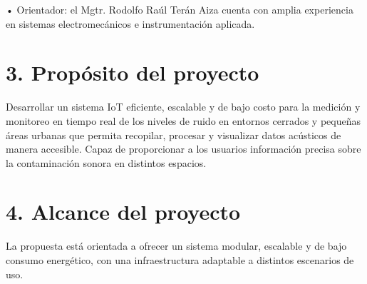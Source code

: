 \documentclass[
11pt, %
]{charter}
\begin{document}
• Orientador: el Mgtr. Rodolfo Raúl Terán Aiza cuenta con amplia experiencia en sistemas electromecánicos e instrumentación aplicada.


\section{3. Propósito del proyecto}
\label{sec:proposito}
 
Desarrollar un sistema IoT eficiente, escalable y de bajo costo para la medición y monitoreo en tiempo real de los niveles de 
ruido en entornos cerrados y pequeñas áreas urbanas que permita recopilar, procesar y visualizar datos acústicos de manera 
accesible. Capaz de proporcionar a los usuarios información precisa sobre la contaminación sonora en distintos espacios. 

\newpage

\section{4. Alcance del proyecto}
\label{sec:alcance}

La propuesta está orientada a ofrecer un sistema modular, escalable y de bajo consumo energético, con una infraestructura 
adaptable a distintos escenarios de uso.
\end{document}
